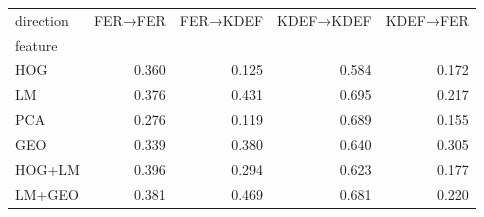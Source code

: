 \begin{tabular}{lrrrr}
\toprule
direction & FER→FER & FER→KDEF & KDEF→KDEF & KDEF→FER \\
feature &  &  &  &  \\
\midrule
HOG & 0.360 & 0.125 & 0.584 & 0.172 \\
LM & 0.376 & 0.431 & 0.695 & 0.217 \\
PCA & 0.276 & 0.119 & 0.689 & 0.155 \\
GEO & 0.339 & 0.380 & 0.640 & 0.305 \\
HOG+LM & 0.396 & 0.294 & 0.623 & 0.177 \\
LM+GEO & 0.381 & 0.469 & 0.681 & 0.220 \\
\bottomrule
\end{tabular}
